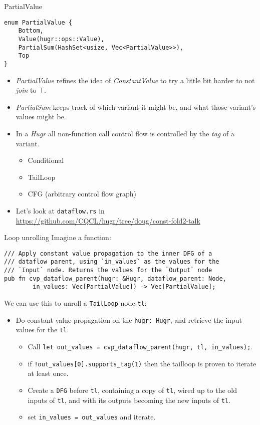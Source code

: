 \documentclass[presentation]{beamer}
\begin{document}
\begin{frame}[label={sec:org9d7d180},fragile]{PartialValue}
 \begin{verbatim}
enum PartialValue {
    Bottom,
    Value(hugr::ops::Value),
    PartialSum(HashSet<usize, Vec<PartialValue>>),
    Top
}
\end{verbatim}

\begin{itemize}
\item \emph{PartialValue} refines the idea of \emph{ConstantValue} to try a little bit harder to not \emph{join} to \(\top\).

\item \emph{PartialSum} keeps track of which variant it might be, and what those variant's values might be.

\item In a \emph{Hugr} all non-function call control flow is controlled by the \emph{tag} of a variant.
\begin{itemize}
\item Conditional
\item TailLoop
\item CFG (arbitrary control flow graph)
\end{itemize}

\item Let's look at \texttt{dataflow.rs} in \url{https://github.com/CQCL/hugr/tree/doug/const-fold2-talk}
\end{itemize}
\end{frame}
\begin{frame}[label={sec:org90ed210},fragile]{Loop unrolling}
 Imagine a function:

\begin{verbatim}
/// Apply constant value propagation to the inner DFG of a
/// dataflow parent, using `in_values` as the values for the
/// `Input` node. Returns the values for the `Output` node
pub fn cvp_dataflow_parent(hugr: &Hugr, dataflow_parent: Node,
        in_values: Vec[PartialValue]) -> Vec[PartialValue];
\end{verbatim}

We can use this to unroll a \texttt{TailLoop} node \texttt{tl}:
\begin{itemize}
\item Do constant value propagation on the \texttt{hugr: Hugr}, and retrieve the input values for the \texttt{tl}.
\begin{itemize}
\item Call \texttt{let out\_values = cvp\_dataflow\_parent(hugr, tl, in\_values);}.
\item if \texttt{!out\_values[0].supports\_tag(1)} then the tailloop is proven to iterate at least once.
\item Create a \texttt{DFG} before \texttt{tl}, containing a copy of \texttt{tl}, wired up to the old inputs of \texttt{tl}, and with its
outputs becoming the new inputs of \texttt{tl}.
\item set \texttt{in\_values = out\_values} and iterate.
\end{itemize}
\end{itemize}
\end{frame}
\end{document}
